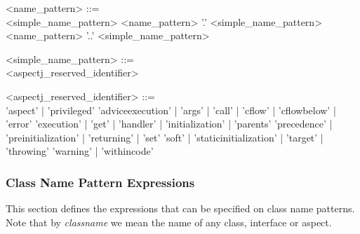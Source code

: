 \begin{minipage}{6in}
\begin{grammar}
\begin{blue}
<name_pattern> ::=  \hspace{1in} \\
      <simple_name_pattern>
\alt  <name_pattern> '.'  <simple_name_pattern>
\alt  <name_pattern> '..' <simple_name_pattern>

<simple_name_pattern> ::= \hspace{1in} \\
      {}
\alt  <aspectj_reserved_identifier>

<aspectj_reserved_identifier> ::= \hspace{1in} \\
   'aspect' | 'privileged' 
\alt 'adviceexecution' | 'args' | 'call' | 'cflow' | 'cflowbelow' | 'error'
\alt 'execution' | 'get' | 'handler' | 'initialization' | 'parents' 
\alt 'precedence' | 'preinitialization' | 'returning' | 'set' 
\alt 'soft' | 'staticinitialization' | 'target' | 'throwing' 
\alt 'warning' | 'withincode'
\end{blue}
\end{grammar}
\end{minipage}

\subsubsection{Class Name Pattern Expressions}

This section defines the expressions that can be specified on
class name patterns.  Note that by {\em classname} we mean the
name of any class, interface or aspect.


